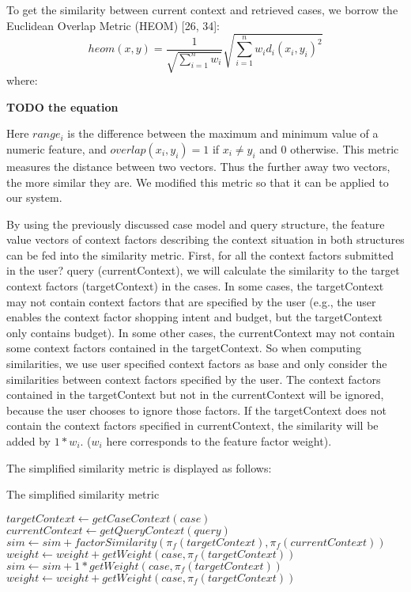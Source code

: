 To get the similarity between current context and retrieved cases, we borrow the Euclidean Overlap Metric (HEOM) [26, 34]:
\begin{equation} \label{eq:heom}
heom(x,y)=\frac{1}{\sqrt{\sum^n_{i=1}w_i}}\sqrt{\sum^n_{i=1}w_id_i(x_i,y_i)^2}
\end{equation}
where:

\textbf{TODO the equation}

Here $range_i$ is the difference between the maximum and minimum value of a numeric feature, and $overlap(x_i, y_i)=1$ if $x_i \neq y_i$ and 0 otherwise. This metric measures the distance between two vectors. Thus the further away two vectors, the more similar they are. We modified this metric so that it can be applied to our system.

By using the previously discussed case model and query structure, the feature value vectors of context factors describing the context situation in both structures can be fed into the similarity metric. First, for all the context factors submitted in the user? query (currentContext), we will calculate the similarity to the target context factors (targetContext) in the cases. In some cases, the targetContext may not contain context factors that are specified by the user (e.g., the user enables the context factor shopping intent and budget, but the targetContext only contains budget). In some other cases, the currentContext may not contain some context factors contained in the targetContext. So when computing similarities, we use user specified context factors as base and only consider the similarities between context factors specified by the user. The context factors contained in the targetContext but not in the currentContext will be ignored, because the user chooses to ignore those factors. If the targetContext does not contain the context factors specified in currentContext, the similarity will be added by $1* w_i$. ($w_i$ here corresponds to the feature factor weight).

The simplified similarity metric is displayed as follows:
\begin{algorithm}
\caption{The simplified similarity metric}
\label{list:similarity}
\begin{algorithmic}
	\State $targetContext \gets getCaseContext(case)$
	\State $currentContext \gets getQueryContext(query)$
			\State $sim \gets sim +  factorSimilarity(\pi_f(targetContext), \pi_f(currentContext))$
			\State $weight \gets weight + getWeight(case,\pi_f(targetContext))$
		\Else
			\State $sim \gets sim +  1*getWeight(case,\pi_f(targetContext))$
			\State $weight \gets weight + getWeight(case,\pi_f(targetContext))$
		\EndIf
	\EndFor
\EndFunction
\end{algorithmic}
\end{algorithm}

